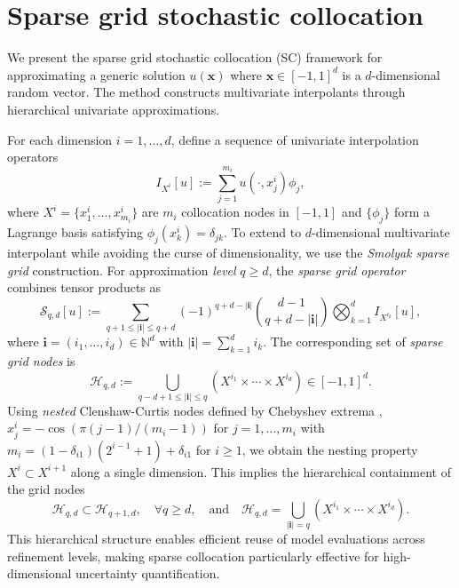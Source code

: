 

\section{Sparse grid stochastic collocation}\label{sec:SC}
We present the sparse grid stochastic collocation (SC) framework \cite{BaNoRi:2000, KlBa:2005, MaNi:2009, Sm:1963} for approximating a generic solution $u(\boldsymbol{x})$ where $\boldsymbol{x} \in [-1,1]^d$ is a $d$-dimensional random vector. The method constructs multivariate interpolants through hierarchical univariate approximations. 

For each dimension $i=1,\ldots,d$, define a sequence of univariate interpolation operators
%
\[
I_{X^{i}}[u]:=\sum_{j=1}^{m_{i}} u(\cdot, x_j^i)\phi_j,
\]
%
where $X^i = \{x_1^i,\ldots, x_{m_i}^i\}$ are $m_i$ collocation nodes in $[-1,1]$ and $\{\phi_j\}$ form a Lagrange basis satisfying $\phi_j(x_k^i) = \delta_{jk}$. To extend to $d$-dimensional multivariate interpolant while avoiding the curse of dimensionality, we use the {\it Smolyak sparse grid} construction. For approximation {\it level} $q \geq d$, the {\it sparse grid operator} combines tensor products as
%
\begin{equation}\label{eq: Smolyak_Quad_formula}
\mathcal{S}_{q,d}[u] := \sum_{q+1 \leq |\boldsymbol{i}| \leq q+d} (-1)^{q+d-|\boldsymbol{i}|} \binom{d-1}{q+d-|\boldsymbol{i}|} \bigotimes_{k=1}^d I_{X^{i_k}}[u],
\end{equation}
%
where $\boldsymbol{i} = (i_1,\ldots,i_d) \in \mathbb{N}^d$ with $|\boldsymbol{i}| = \sum_{k=1}^d i_k$. The corresponding set of {\it sparse grid nodes} is
%
\begin{equation}\label{eq:sparse_grid_nodes}
\mathcal{H}_{q,d} := \bigcup_{q-d+1 \leq |\boldsymbol{i}| \leq q} \left( X^{i_1} \times \cdots \times X^{i_d} \right)\in [-1,1]^d.
\end{equation}
%
Using \textit{nested} Clenshaw-Curtis nodes defined by Chebyshev extrema \cite{BaNoRi:2000, ClCu:1960}, $x_j^i = -\cos(\pi(j-1)/(m_i-1))$ for $j=1,\ldots,m_i$ with $m_i = (1-\delta_{i1})(2^{i-1}+1)+\delta_{i1}$ for $i\ge 1$, we obtain the nesting property $X^i \subset X^{i+1}$ along a single dimension. This implies the hierarchical containment of the grid nodes
%
\begin{equation}\label{eq:nested_grids}
\mathcal{H}_{q,d} \subset \mathcal{H}_{q+1,d}, \quad \forall q \geq d, \quad \text{and}\quad \mathcal{H}_{q,d} = \bigcup_{|\boldsymbol{i}|=q} \left(X^{i_1}\times \cdots\times X^{i_d}\right).
\end{equation}
%
This hierarchical structure enables efficient reuse of model evaluations across refinement levels, making sparse collocation particularly effective for high-dimensional uncertainty quantification.



